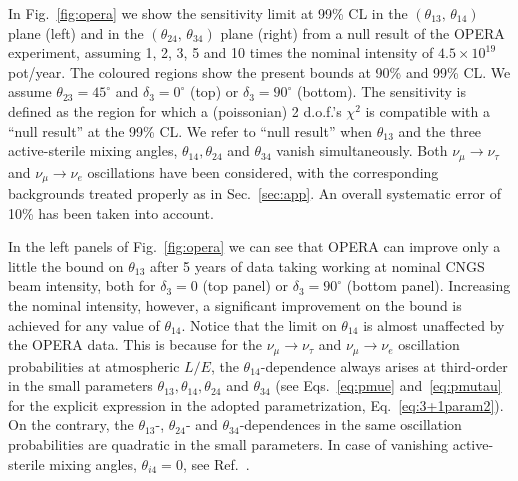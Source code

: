 \documentclass[12pt]{elsart}
\begin{document}
In Fig.~\ref{fig:opera} we show the sensitivity limit at 99\% CL in
the $(\theta_{13},\,\theta_{14})$ plane (left) and in the
$(\theta_{24},\,\theta_{34})$ plane (right) from a null result of the
OPERA experiment, assuming 1, 2, 3, 5 and 10 times the nominal
intensity of $4.5 \times 10^{19}$ pot/year.  The coloured regions show
the present bounds at 90\% and 99\% CL. We assume $\theta_{23} =
45^\circ$ and $\delta_3 = 0^\circ$ (top) or $\delta_3 = 90^\circ$
(bottom). The sensitivity is defined as the region for which a
(poissonian) 2 d.o.f.'s $\chi^2$ is compatible with a ``null result''
at the 99\% CL.  We refer to ``null result'' when $\theta_{13}$ and
the three active-sterile mixing angles, $\theta_{14},\theta_{24}$ and
$\theta_{34}$ vanish simultaneously.  Both $\nu_\mu \to \nu_\tau$ and
$\nu_\mu \to \nu_e$ oscillations have been considered, with the
corresponding backgrounds treated properly as in Sec.~\ref{sec:app}. 
An overall systematic error of 10\% has been taken into account.  

In the left panels of Fig.~\ref{fig:opera} we can see that OPERA can
improve only a little the bound on $\theta_{13}$ after 5 years of data
taking working at nominal CNGS beam intensity, both for $\delta_3 = 0$
(top panel) or $\delta_3 = 90^\circ$ (bottom panel).  Increasing the
nominal intensity, however, a significant improvement on the bound is
achieved for any value of $\theta_{14}$. Notice that the limit on
$\theta_{14}$ is almost unaffected by the OPERA data.  This is because
for the $\nu_\mu \to \nu_\tau$ and $\nu_\mu \to \nu_e$ oscillation
probabilities at atmospheric $L/E$, the $\theta_{14}$-dependence
always arises at third-order in the small parameters
$\theta_{13},\theta_{14},\theta_{24}$ and $\theta_{34}$ (see
Eqs.~\eqref{eq:pmue} and~\eqref{eq:pmutau} for the explicit expression
in the adopted parametrization, Eq.~\eqref{eq:3+1param2}). On the
contrary, the $\theta_{13}$-, $\theta_{24}$- and
$\theta_{34}$-dependences in the same oscillation probabilities are
quadratic in the small parameters.  In case of vanishing
active-sterile mixing angles, $\theta_{i4} = 0$, see
Ref.~\cite{Komatsu:2002sz}. 
\end{document}
